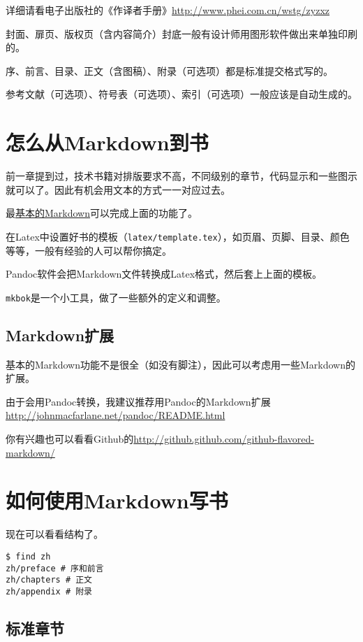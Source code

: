 \documentclass[a4paper]{book}
\begin{document}
详细请看电子出版社的《作译者手册》\url{http://www.phei.com.cn/wstg/zyzxz}

封面、扉页、版权页（含内容简介）封底一般有设计师用图形软件做出来单独印刷的。

序、前言、目录、正文（含图稿）、附录（可选项）都是标准提交格式写的。

参考文献（可选项）、符号表（可选项）、索引（可选项）一般应该是自动生成的。

\section{怎么从Markdown到书}

前一章提到过，技术书籍对排版要求不高，不同级别的章节，代码显示和一些图示就可以了。因此有机会用文本的方式一一对应过去。

最\href{http://daringfireball.net/projects/markdown/}{基本的Markdown}可以完成上面的功能了。

在Latex中设置好书的模板（{\texttt{latex/template.tex}}），如页眉、页脚、目录、颜色等等，一般有经验的人可以帮你搞定。

Pandoc软件会把Markdown文件转换成Latex格式，然后套上上面的模板。

{\texttt{mkbok}}是一个小工具，做了一些额外的定义和调整。

\subsection{Markdown扩展}

基本的Markdown功能不是很全（如没有脚注），因此可以考虑用一些Markdown的扩展。

由于会用Pandoc转换，我建议推荐用Pandoc的Markdown扩展\url{http://johnmacfarlane.net/pandoc/README.html}

你有兴趣也可以看看Github的\url{http://github.github.com/github-flavored-markdown/}

\section{如何使用Markdown写书}

现在可以看看结构了。

{\footnotesize\begin{shaded}\begin{verbatim}
$ find zh
zh/preface # 序和前言
zh/chapters # 正文
zh/appendix # 附录
\end{verbatim}\end{shaded}}
\subsection{标准章节}
\end{document}
